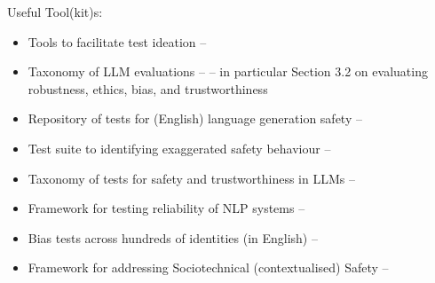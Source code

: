 \noindent Useful Tool(kit)s: 
\begin{itemize}
    \item Tools to facilitate test ideation -- \citet{ribeiro_beyond_2020}
    \item Taxonomy of LLM
evaluations -- \citet{chang_survey_2023} -- in particular Section 3.2 on evaluating robustness, ethics, bias, and trustworthiness
\item Repository of tests for (English) language generation safety -- \citet{dinan_safetykit_2022}
    \item Test suite to identifying exaggerated safety behaviour -- \citet{rottger_xstest_2024}
    \item Taxonomy of tests for safety and trustworthiness in LLMs -- \citet{huang_survey_2023} 
    \item Framework for testing reliability of NLP systems -- \citet{tan_reliability_2021}
    \item Bias tests across hundreds of identities (in English) -- \citet{smith_im_2022}
    \item Framework for addressing Sociotechnical (contextualised) Safety -- \citet{weidinger2023sociotechnical}
\end{itemize}